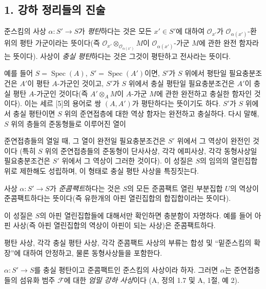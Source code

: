 
\subsection*{1. 강하 정리들의 진술}

 준스킴의 사상
$\alpha:S'\longrightarrow S$가 \emph{평탄}하다는 것은 모든
$x'\in S'$에 대하여 $\mathcal O_{x'}$가
$\mathcal O_{\alpha(x')}$-환 위의 평탄 가군이라는 뜻이다(즉
$\mathcal O_{x'}\otimes_{\mathcal O_{\alpha(x')}}M$이
$\mathcal O_{\alpha(x')}$-가군 $M$에 관한 완전 함자라는 뜻이다).
사상이 \emph{충실 평탄}하다는 것은 그것이 평탄하고 전사라는 뜻이다.

예를 들어 $S=\operatorname{Spec}(A)$,
$S'=\operatorname{Spec}(A')$이면, $S'$가 $S$ 위에서 평탄일
필요충분조건은 $A'$이 평탄 $A$-가군인 것이고, $S'$가 $S$ 위에서
충실 평탄일 필요충분조건은 $A'$이 충실 평탄 $A$-가군인 것이다(즉
$A'\otimes_A M$이 $A$-가군 $M$에 관한 완전하고 충실한 함자인 것이다).
이는 세르 [5]의 용어로 쌍 $(A,A')$가 평탄하다는 뜻이기도 하다.
$S'$가 $S$ 위에서 충실 평탄이면 $S$ 위의 준연접층에 대한 역상 함자는
완전하고 충실하다. 다시 말해, $S$ 위의 층들의 준동형들로 이루어진 열이

준연접층들의 열일 때, 그 열이 완전일 필요충분조건은 $S'$ 위에서 그
역상이 완전인 것이다
(특히 $S$ 위의 준연접층들의 준동형이 단사사상, 각각 에피사상, 각각
동형사상일 필요충분조건은 $S'$ 위에서 그 역상이 그러한 것이다). 이
성질은 $S$의 임의의 열린집합 위로 제한해도 성립하며, 이 형태로
충실 평탄 사상을 특징짓는다.

 사상 $\alpha:S'\longrightarrow S$가
\emph{준콤팩트}하다는 것은 $S$의 모든 준콤팩트 열린 부분집합 $U$의
역상이 준콤팩트하다는 뜻이다(즉 유한개의 아핀 열린집합의 합집합이라는
뜻이다).

이 성질은 $S$의 아핀 열린집합들에 대해서만 확인하면 충분함이 자명하다.
예를 들어 아핀 사상(즉 아핀 열린집합의 역상이 아핀이 되는 사상)은
준콤팩트하다.

평탄 사상, 각각 충실 평탄 사상, 각각 준콤팩트 사상의 부류는 합성 및
“밑준스킴의 확장”에 대하여 안정하고, 물론 동형사상들을 포함한다.

 $\alpha:S'\longrightarrow S$를 충실 평탄이고
준콤팩트인 준스킴의 사상이라 하자. 그러면 $\alpha$는 준연접층들의
섬유화 범주 $\mathcal F$에 대한 \emph{엄밀 강하 사상}이다
(A, 정의 1.7 및 A, 1절, 예 2).

